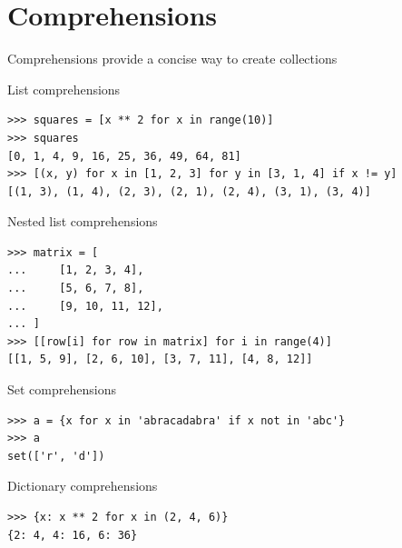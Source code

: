 \documentclass[8pt,a4paper,compress]{beamer}
\begin{document}
\section{Comprehensions}
\begin{frame}[fragile]
\pause

Comprehensions provide a concise way to create collections

\pause\bigskip

List comprehensions

\smallskip

\begin{lstlisting}[language={},style=focusin]
>>> squares = [x ** 2 for x in range(10)]
>>> squares
[0, 1, 4, 9, 16, 25, 36, 49, 64, 81]
>>> [(x, y) for x in [1, 2, 3] for y in [3, 1, 4] if x != y]
[(1, 3), (1, 4), (2, 3), (2, 1), (2, 4), (3, 1), (3, 4)]
\end{lstlisting}

\pause\bigskip

Nested list comprehensions

\smallskip

\begin{lstlisting}[language={},style=focusin]
>>> matrix = [
...     [1, 2, 3, 4],
...     [5, 6, 7, 8],
...     [9, 10, 11, 12],
... ]
>>> [[row[i] for row in matrix] for i in range(4)]
[[1, 5, 9], [2, 6, 10], [3, 7, 11], [4, 8, 12]]
\end{lstlisting}

\pause\bigskip

Set comprehensions

\smallskip

\begin{lstlisting}[language={},style=focusin]
>>> a = {x for x in 'abracadabra' if x not in 'abc'}
>>> a
set(['r', 'd'])
\end{lstlisting}

\pause\bigskip

Dictionary comprehensions

\smallskip

\begin{lstlisting}[language={},style=focusin]
>>> {x: x ** 2 for x in (2, 4, 6)}
{2: 4, 4: 16, 6: 36}
\end{lstlisting}
\end{frame}
\end{document}
